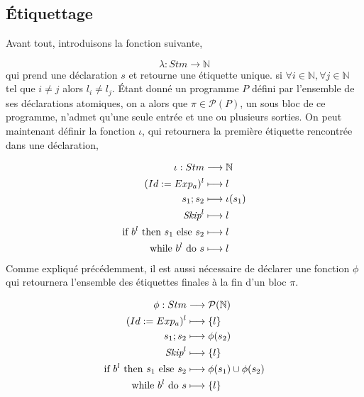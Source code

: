 \subsection{Étiquettage}
Avant tout, introduisons la fonction suivante,

\[
	\lambda: Stm \longrightarrow \mathbb{N}
\]
\newline
qui prend une déclaration $s$ et retourne une étiquette unique.
\newline
\newline
{}
si $\forall i \in \mathbb{N}, \forall j \in \mathbb{N}$ tel que $i \ne j$ alors $l_i \ne l_j$.
\newline
\newline
Étant donné un programme $P$ défini par l'ensemble de ses déclarations atomiques, on a alors que 
$\pi \in \mathcal{P}(P)$, un sous bloc de ce programme, n'admet qu'une seule entrée et une ou plusieurs sorties. 
On peut maintenant définir la fonction $\iota$, qui retournera la première étiquette rencontrée dans une déclaration,

\begin{align*}
	\iota : Stm &\longrightarrow \mathbb{N}\\
	({Id}\space:=\space{Exp_a})^l &\longmapsto l\\
	{s_1}\space;\space{s_2} &\longmapsto \iota(s_1)\\
	{\textit{Skip}}^l &\longmapsto l\\
	\text{if }{b^l}\text{ then }{s_1}\text{ else }{s_2} &\longmapsto l\\
	\text{while }{b^l}\text{ do }{s} &\longmapsto l
\end{align*}
Comme expliqué précédemment, il est aussi nécessaire de déclarer une fonction $\phi$ qui retournera l'ensemble des étiquettes finales 
à la fin d'un bloc $\pi$.

\begin{align*}
	\phi : Stm &\longrightarrow \mathcal{P}(\mathbb{N})\\
	({Id}\space:=\space{Exp_a})^l &\longmapsto \{l\}\\
	{s_1}\space;\space{s_2} &\longmapsto \phi(s_2)\\
	\textit{Skip}^l &\longmapsto \{l\}\\
	\text{if }{b^l}\text{ then }{s_1}\text{ else }{s_2} &\longmapsto \phi(s_1) \cup \phi(s_2)\\
	\text{while }{b^l}\text{ do }{s} &\longmapsto \{l\}
\end{align*}